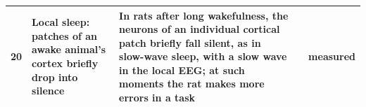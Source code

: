 {\begin{longtable}{>{\raggedright}p{0.5cm}>{\raggedright}p{4.0cm}>{\raggedright}p{5.6cm}>{\raggedright}p{2.3cm}>{\raggedright\arraybackslash}p{1.7cm}}
20 & Local sleep: patches of an awake animal's cortex briefly drop into silence & In rats after long wakefulness, the neurons of an individual cortical patch briefly fall silent, as in slow-wave sleep, with a slow wave in the local EEG; at such moments the rat makes more errors in a task & \cite{Vyazovskiy2011} & measured \\
\bottomrule
\end{longtable}}
